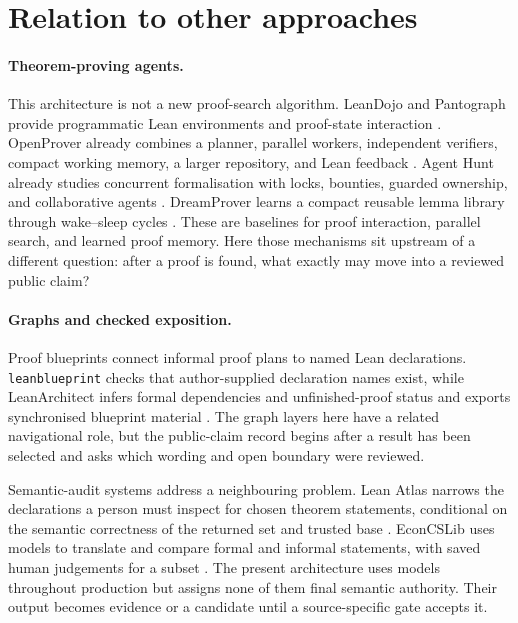 \documentclass[10pt]{article}
\begin{document}
\section{Relation to other approaches}\label{sec:related}
\small

\paragraph{Theorem-proving agents.}
This architecture is not a new proof-search algorithm. LeanDojo and Pantograph
provide programmatic Lean environments and proof-state interaction
\cite{leandojo,pantograph}. OpenProver already combines a planner, parallel
workers, independent verifiers, compact working memory, a larger repository,
and Lean feedback \cite{openprover}. Agent Hunt already studies concurrent
formalisation with locks, bounties, guarded ownership, and collaborative
agents \cite{agenthunt}. DreamProver learns a compact reusable lemma library
through wake--sleep cycles \cite{dreamprover}. These are baselines for proof
interaction, parallel search, and learned proof memory. Here those mechanisms
sit upstream of a different question: after a proof is found, what exactly may
move into a reviewed public claim?

\paragraph{Graphs and checked exposition.}
Proof blueprints connect informal proof plans to named Lean declarations.
\texttt{leanblueprint} checks that author-supplied declaration names exist,
while LeanArchitect infers formal dependencies and unfinished-proof status and
exports synchronised blueprint material \cite{leanblueprint,leanarchitect}.
The graph layers here have a related navigational role, but the public-claim
record begins after a result has been selected and asks which wording and open
boundary were reviewed.

Semantic-audit systems address a neighbouring problem. Lean Atlas narrows the
declarations a person must inspect for chosen theorem statements, conditional
on the semantic correctness of the returned set and trusted base
\cite{leanatlas}. EconCSLib uses models to translate and compare formal and
informal statements, with saved human judgements for a subset \cite{econcs}.
The present architecture uses models throughout production but assigns none of
them final semantic authority. Their output becomes evidence or a candidate
until a source-specific gate accepts it.
\end{document}
